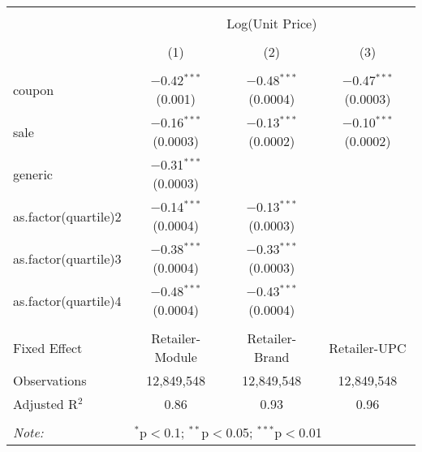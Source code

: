
\begin{table}[!htbp] \centering 
  \caption{} 
  \label{tab:overallSavingsNonStorable} 
\begin{tabular}{@{\extracolsep{5pt}}lccc} 
\\[-1.8ex]\hline 
\hline \\[-1.8ex] 
 & \multicolumn{3}{c}{Log(Unit Price)} \\ 
\\[-1.8ex] & (1) & (2) & (3)\\ 
\hline \\[-1.8ex] 
 coupon & $-$0.42$^{***}$ (0.001) & $-$0.48$^{***}$ (0.0004) & $-$0.47$^{***}$ (0.0003) \\ 
  sale & $-$0.16$^{***}$ (0.0003) & $-$0.13$^{***}$ (0.0002) & $-$0.10$^{***}$ (0.0002) \\ 
  generic & $-$0.31$^{***}$ (0.0003) &  &  \\ 
  as.factor(quartile)2 & $-$0.14$^{***}$ (0.0004) & $-$0.13$^{***}$ (0.0003) &  \\ 
  as.factor(quartile)3 & $-$0.38$^{***}$ (0.0004) & $-$0.33$^{***}$ (0.0003) &  \\ 
  as.factor(quartile)4 & $-$0.48$^{***}$ (0.0004) & $-$0.43$^{***}$ (0.0004) &  \\ 
 \hline \\[-1.8ex] 
Fixed Effect & Retailer-Module & Retailer-Brand & Retailer-UPC \\ 
Observations & 12,849,548 & 12,849,548 & 12,849,548 \\ 
Adjusted R$^{2}$ & 0.86 & 0.93 & 0.96 \\ 
\hline 
\hline \\[-1.8ex] 
\textit{Note:}  & \multicolumn{3}{l}{$^{*}$p$<$0.1; $^{**}$p$<$0.05; $^{***}$p$<$0.01} \\ 
\end{tabular} 
\end{table} 
